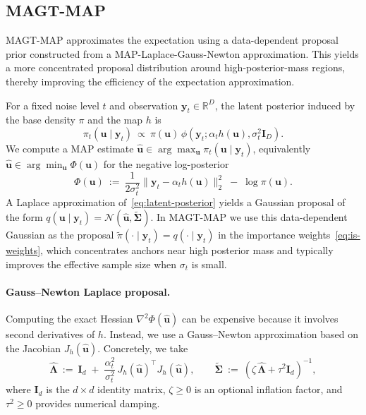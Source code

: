 \documentclass[12pt]{article}
\theoremstyle{definition} %
\newcommand{\R}{\mathbb{R}}
\newcommand{\y}{\bm y}
\providecommand{\method}{MAGT} %
\begin{document}
\subsection{\method{}-MAP}
\method{}-MAP approximates the expectation using a data-dependent proposal prior
constructed from a MAP-Laplace-Gauss-Newton approximation.
This yields a more concentrated proposal distribution around high-posterior-mass regions,
thereby improving the efficiency of the expectation approximation.

For a fixed noise level $t$ and observation $\y_t\in\R^D$, the latent posterior induced by the base density $\pi$ and the map $h$ is
\begin{equation}
\label{eq:latent-posterior}
\pi_t(\bm u\mid \y_t)\ \propto\ \pi(\bm u)\,\phi\!\left(\y_t;\alpha_t h(\bm u),\sigma_t^2 \bm I_D\right).
\end{equation}
We compute a MAP estimate $\hat{\bm u}\in\arg\max_{\bm u}\pi_t(\bm u\mid \y_t)$, equivalently
$\hat{\bm u}\in\arg\min_{\bm u}\Phi(\bm u)$ for the negative log-posterior
\[
\Phi(\bm u)
\ :=\ 
\frac{1}{2\sigma_t^2}\big\|\y_t-\alpha_t h(\bm u)\big\|_2^2\;-\;\log \pi(\bm u).
\]
A Laplace approximation of~\eqref{eq:latent-posterior} yields a Gaussian proposal of the form
$q(\bm u\mid \y_t)=\mathcal{N}(\hat{\bm u},\tilde{\bm\Sigma})$.
In \method{}-MAP we use this data-dependent Gaussian as the proposal
$\tilde\pi(\cdot\mid \y_t)=q(\cdot\mid \y_t)$ in the importance weights~\eqref{eq:is-weights},
which concentrates anchors near high posterior mass and typically improves the effective sample size when $\sigma_t$ is small.

\paragraph{Gauss--Newton Laplace proposal.}
Computing the exact Hessian $\nabla^2\Phi(\hat{\bm u})$ can be expensive because it involves second derivatives of $h$.
Instead, we use a Gauss--Newton approximation based on the Jacobian $J_h(\hat{\bm u})$.
Concretely, we take
\[
\hat{\bm\Lambda}
\ :=\ 
\bm I_d \;+\;\frac{\alpha_t^2}{\sigma_t^2}\, J_h(\hat{\bm u})^{\top}J_h(\hat{\bm u}),
\qquad
\tilde{\bm\Sigma}
\ :=\ 
(\zeta\,\hat{\bm\Lambda} + \tau^2 \bm I_d)^{-1},
\]
where $\bm I_d$ is the $d\times d$ identity matrix, $\zeta\ge 0$ is an optional inflation factor, and $\tau^2\ge 0$ provides numerical damping.
\end{document}

